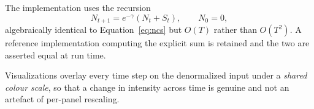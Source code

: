 The implementation uses the recursion
\begin{equation}
N_{t+1} = e^{-\gamma}\left(N_{t} + S_{t}\right), \qquad N_0 = 0,
\end{equation}
algebraically identical to Equation~\ref{eq:ncs} but $O(T)$ rather than
$O(T^2)$. A reference implementation computing the explicit sum is retained and
the two are asserted equal at run time.

Visualizations overlay every time step on the denormalized input under a
\emph{shared colour scale}, so that a change in intensity across time is genuine
and not an artefact of per-panel rescaling.
